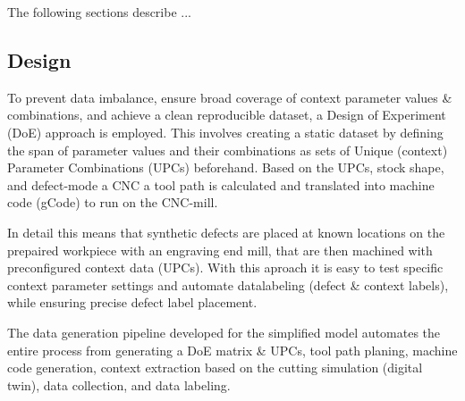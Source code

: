 \documentclass[5p,times,procedia]{elsarticle}
\begin{document}
The following sections describe ...


 








\subsection{Design}
\vspace*{-\baselineskip}
To prevent data imbalance, ensure broad coverage of context parameter values \& combinations, and achieve a clean reproducible dataset, a Design of Experiment (DoE) approach is employed. This involves creating a static dataset by defining the span of parameter values and their combinations as sets of Unique (context) Parameter Combinations (UPCs) beforehand.
Based on the UPCs, stock shape, and defect-mode a CNC a tool path is calculated and translated into machine code (gCode) to run on the CNC-mill. 


In detail this means that synthetic defects are placed at known locations on the prepaired workpiece with an engraving end mill, that are then machined with preconfigured context data (UPCs). 
With this aproach it is easy to test specific context parameter settings and automate datalabeling (defect \& context labels), while ensuring precise defect label placement.


The data generation pipeline developed for the simplified model automates the entire process from generating a DoE matrix \& UPCs, tool path planing, machine code generation, context extraction based on the cutting simulation (digital twin), data collection, and data labeling.
\end{document}
